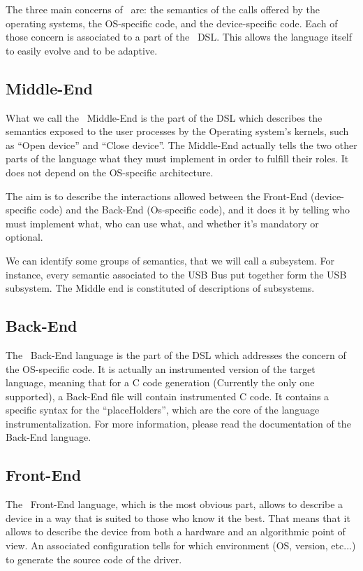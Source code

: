 \documentclass[american]{rtxreport}
\begin{document}
The three main concerns of \rtx\ are: the semantics of the calls offered by the
operating systems, the OS-specific code, and the device-specific code. Each
of those concern is associated to a part of the \rtx\ DSL. This allows the
language itself to easily evolve and to be adaptive.

\subsection{Middle-End}

What we call the \rtx\ Middle-End is the part of the DSL which describes the
semantics exposed to the user processes by the Operating system's kernels, such
as ``Open device'' and ``Close device''. The Middle-End actually tells the two
other parts of the language what they must implement in order to fulfill their
roles. It does not depend on the OS-specific architecture.

The aim is to describe the interactions allowed between the Front-End
(device-specific code) and the Back-End (Os-specific code), and it does it by
telling who must implement what, who can use what, and whether it's mandatory
or optional.

We can identify some groups of semantics, that we will call a subsystem. For
instance, every semantic associated to the USB Bus put together form the USB
subsystem. The Middle end is constituted of descriptions of subsystems.

\subsection{Back-End}

The \rtx\ Back-End language is the part of the DSL which addresses the concern
of the OS-specific code. It is actually an instrumented version of the target
language, meaning that for a C code generation (Currently the only one
supported), a Back-End file will contain instrumented C code. It contains a
specific syntax for the ``placeHolders'', which are the core of the language
instrumentalization. For more information, please read the documentation of
the Back-End language.

\subsection{Front-End}

The \rtx\ Front-End language, which is the most obvious part, allows to describe
a device in a way that is suited to those who know it the best. That means that
it allows to describe the device from both a hardware and an algorithmic point
of view. An associated configuration tells for which environment (OS, version,
etc...) to generate the source code of the driver.
\end{document}
